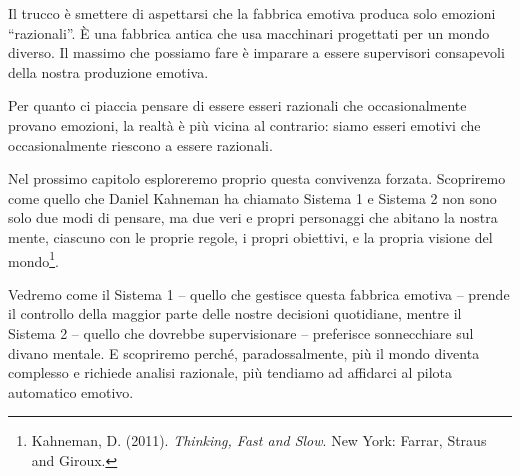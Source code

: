 Il trucco è smettere di aspettarsi che la fabbrica emotiva produca solo emozioni ``razionali''. È una fabbrica antica che usa macchinari progettati per un mondo diverso. Il massimo che possiamo fare è imparare a essere supervisori consapevoli della nostra produzione emotiva.

Per quanto ci piaccia pensare di essere esseri razionali che occasionalmente provano emozioni, la realtà è più vicina al contrario: siamo esseri emotivi che occasionalmente riescono a essere razionali.

\bigskip

Nel prossimo capitolo esploreremo proprio questa convivenza forzata. Scopriremo come quello che Daniel Kahneman ha chiamato Sistema 1 e Sistema 2 non sono solo due modi di pensare, ma due veri e propri personaggi che abitano la nostra mente, ciascuno con le proprie regole, i propri obiettivi, e la propria visione del mondo\footnote{Kahneman, D. (2011). \textit{Thinking, Fast and Slow}. New York: Farrar, Straus and Giroux.}.

Vedremo come il Sistema 1 -- quello che gestisce questa fabbrica emotiva -- prende il controllo della maggior parte delle nostre decisioni quotidiane, mentre il Sistema 2 -- quello che dovrebbe supervisionare -- preferisce sonnecchiare sul divano mentale. E scopriremo perché, paradossalmente, più il mondo diventa complesso e richiede analisi razionale, più tendiamo ad affidarci al pilota automatico emotivo.